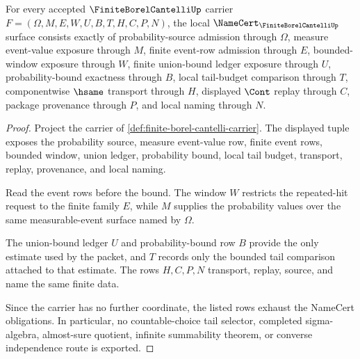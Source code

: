 \begin{theorem}
\label{thm:finite-borel-cantelli-namecert-obligations}
For every accepted $\FiniteBorelCantelliUp$ carrier $F=(\Omega,M,E,W,U,B,T,H,C,P,N)$, the local $\NameCert_{\FiniteBorelCantelliUp}$ surface consists exactly of probability-source admission through $\Omega$, measure event-value exposure through $M$, finite event-row admission through $E$, bounded-window exposure through $W$, finite union-bound ledger exposure through $U$, probability-bound exactness through $B$, local tail-budget comparison through $T$, componentwise $\hsame$ transport through $H$, displayed $\Cont$ replay through $C$, package provenance through $P$, and local naming through $N$.
\end{theorem}
\begin{proof}
Project the carrier of \autoref{def:finite-borel-cantelli-carrier}. The displayed tuple exposes the probability source, measure event-value row, finite event rows, bounded window, union ledger, probability bound, local tail budget, transport, replay, provenance, and local naming.

Read the event rows before the bound. The window $W$ restricts the repeated-hit request to the finite family $E$, while $M$ supplies the probability values over the same measurable-event surface named by $\Omega$.

The union-bound ledger $U$ and probability-bound row $B$ provide the only estimate used by the packet, and $T$ records only the bounded tail comparison attached to that estimate. The rows $H,C,P,N$ transport, replay, source, and name the same finite data.

Since the carrier has no further coordinate, the listed rows exhaust the NameCert obligations. In particular, no countable-choice tail selector, completed sigma-algebra, almost-sure quotient, infinite summability theorem, or converse independence route is exported.
\end{proof}

